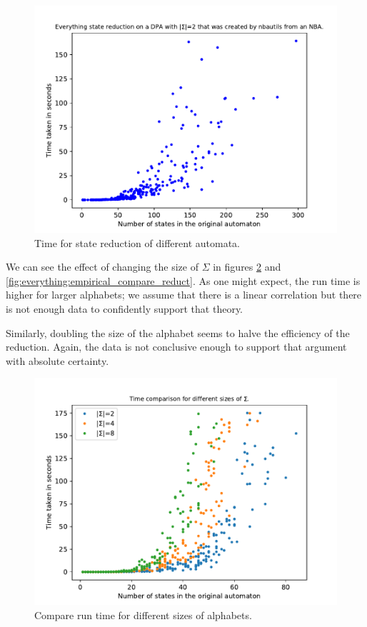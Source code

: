 \begin{figure}
\begin{minipage}{0.49\textwidth}
		\includegraphics[page=1,height=.3\textheight]{../data/analysis/everything/detnbaut_ap1.pdf} 
		\caption{Time for state reduction of different automata.}
		\label{fig:everything:empirical_time}
	\end{minipage}
\end{figure}


We can see the effect of changing the size of $\Sigma$ in figures \ref{fig:everything:empirical_compare_time} and \ref{fig:everything:empirical_compare_reduct}. As one might expect, the run time is higher for larger alphabets; we assume that there is a linear correlation but there is not enough data to confidently support that theory.

Similarly, doubling the size of the alphabet seems to halve the efficiency of the reduction. Again, the data is not conclusive enough to support that argument with absolute certainty.




\begin{figure}
	\centering
	\includegraphics[page=1,height=.3\textheight]{../data/analysis/everything/ap_time_comparison.pdf} 
	\caption{Compare run time for different sizes of alphabets.}
	\label{fig:everything:empirical_compare_time}
\end{figure}


